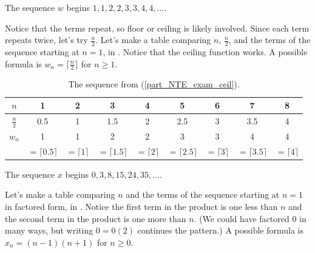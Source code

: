 \begin{exam}
\begin{apart}
            \item \label{part_NTE_exam_ceil} The sequence $w$ begins $1,1,2,2,3,3,4,4, \ldots$.  
                \begin{soln}
                    Notice that the terms repeat, so floor or ceiling is likely involved. Since each term repeats twice, let's try $\frac{n}{2}$. Let's make a table comparing $n$, $\frac{n}{2}$, and the terms of the sequence starting at $n=1$, in . Notice that the ceiling function works.  A possible formula is $w_n = \lceil \frac{n}{2} \rceil$ for $n \ge 1$.
                \end{soln} 
                \begin{table}[hbtp]
                    \centering
                    \begin{tabular}{c| c|c|c|c| c|c|c|c}
                        $n$ & 1 & 2 & 3 & 4 & 5 & 6 & 7 & 8\\ \hline
                        $\frac{n}{2}$ & 0.5 & 1 & 1.5 & 2 & 2.5 & 3 & 3.5 & 4 \\ \hline
                        $w_n$ & 1 & 1 & 2 & 2 & 3 & 3 & 4 & 4\\
                        & $=\lceil 0.5 \rceil$ & $=\lceil 1 \rceil$ & $=\lceil 1.5 \rceil$ & $=\lceil 2 \rceil$ & $=\lceil 2.5 \rceil$ & $=\lceil 3 \rceil$ & $=\lceil 3.5 \rceil$ & $=\lceil 4 \rceil$ \\ 
                    \end{tabular}
                    \caption{The sequence from  (\ref{part_NTE_exam_ceil}).}
                    \label{tab_NTE_exam_ceil}
                \end{table}

            \item \label{part_NTE_exam_sq} The sequence $x$ begins $0, 3, 8, 15, 24, 35, \ldots$.
                \begin{soln}
                    Let's make a table comparing $n$ and the terms of the sequence starting at $n=1$ in factored form, in . Notice the first term in the product is one less than $n$ and the second term in the product is one more than $n$. (We could have factored 0 in many ways, but writing $0 = 0(2)$ continues the pattern.) A possible formula is $x_n = (n-1)(n+1)$ for $n \ge 0$.


\end{soln}
\end{apart}
\end{exam}

